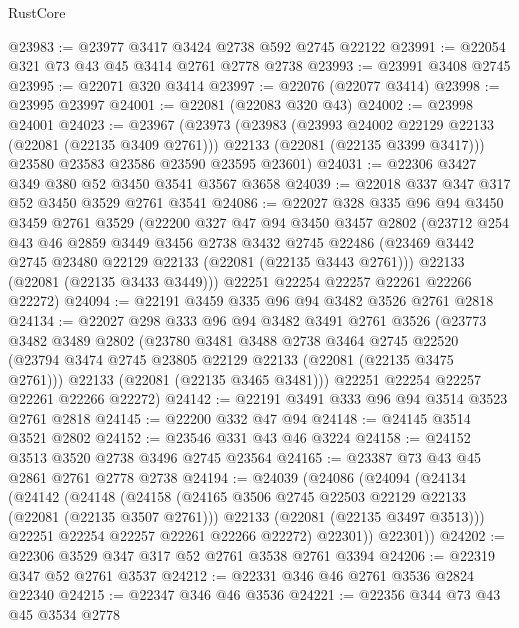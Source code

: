 \begin{lexlean}{RustCore}
\begin{coremodule}
@23983 := @23977 @3417 @3424 @2738 @592 @2745 @22122
@23991 := @22054 @321 @73 @43 @45 @3414 @2761 @2778 @2738
@23993 := @23991 @3408 @2745
@23995 := @22071 @320 @3414
@23997 := @22076 (@22077 @3414)
@23998 := @23995 @23997
@24001 := @22081 (@22083 @320 @43)
@24002 := @23998 @24001
@24023 := @23967
    (@23973
      (@23983
        (@23993 @24002 @22129 @22133 (@22081 (@22135 @3409 @2761)))
        @22133
        (@22081 (@22135 @3399 @3417)))
      @23580
      @23583
      @23586
      @23590
      @23595
      @23601)
@24031 := @22306 @3427 @349 @380 @52 @3450 @3541 @3567 @3658
@24039 := @22018 @337 @347 @317 @52 @3450 @3529 @2761 @3541
@24086 := @22027
    @328
    @335
    @96
    @94
    @3450
    @3459
    @2761
    @3529
    (@22200
      @327
      @47
      @94
      @3450
      @3457
      @2802
      (@23712
        @254
        @43
        @46
        @2859
        @3449
        @3456
        @2738
        @3432
        @2745
        @22486
        (@23469 @3442 @2745 @23480 @22129 @22133 (@22081 (@22135 @3443 @2761)))
        @22133
        (@22081 (@22135 @3433 @3449)))
      @22251
      @22254
      @22257
      @22261
      @22266
      @22272)
@24094 := @22191 @3459 @335 @96 @94 @3482 @3526 @2761 @2818
@24134 := @22027
    @298
    @333
    @96
    @94
    @3482
    @3491
    @2761
    @3526
    (@23773
      @3482
      @3489
      @2802
      (@23780
        @3481
        @3488
        @2738
        @3464
        @2745
        @22520
        (@23794 @3474 @2745 @23805 @22129 @22133 (@22081 (@22135 @3475 @2761)))
        @22133
        (@22081 (@22135 @3465 @3481)))
      @22251
      @22254
      @22257
      @22261
      @22266
      @22272)
@24142 := @22191 @3491 @333 @96 @94 @3514 @3523 @2761 @2818
@24145 := @22200 @332 @47 @94
@24148 := @24145 @3514 @3521 @2802
@24152 := @23546 @331 @43 @46 @3224
@24158 := @24152 @3513 @3520 @2738 @3496 @2745 @23564
@24165 := @23387 @73 @43 @45 @2861 @2761 @2778 @2738
@24194 := @24039
    (@24086
      (@24094
        (@24134
          (@24142
            (@24148
              (@24158
                (@24165 @3506 @2745 @22503 @22129 @22133 (@22081 (@22135 @3507 @2761)))
                @22133
                (@22081 (@22135 @3497 @3513)))
              @22251
              @22254
              @22257
              @22261
              @22266
              @22272)
            @22301))
        @22301))
@24202 := @22306 @3529 @347 @317 @52 @2761 @3538 @2761 @3394
@24206 := @22319 @347 @52 @2761 @3537
@24212 := @22331 @346 @46 @2761 @3536 @2824 @22340
@24215 := @22347 @346 @46 @3536
@24221 := @22356 @344 @73 @43 @45 @3534 @2778

\end{coremodule}
\end{lexlean}
